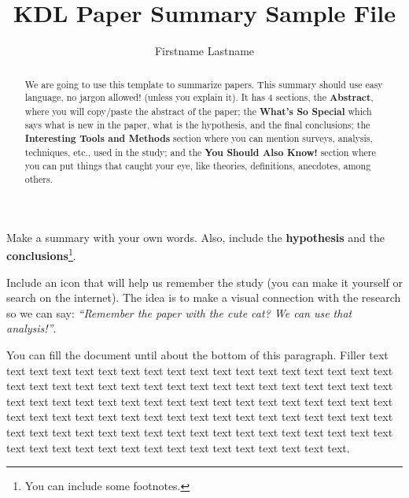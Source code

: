 \documentclass{kdl-summary}
\title{KDL Paper Summary Sample File}
\author{Firstname Lastname}
\begin{document}
\nocite{*}

\twocolumn[\maketitle]



\begin{abstract}
    We are going to use this template to summarize papers. This summary should
    use easy language, no jargon allowed! (unless you explain it).
    It has 4 sections, the \textbf{Abstract}, where you will copy/paste the
    abstract of the paper; the \textbf{What's So Special} which says what is
    new in the paper, what is the hypothesis, and the final conclusions; the
    \textbf{Interesting Tools and Methods} section where you can mention surveys,
    analysis, techniques, etc., used in the study; and the \textbf{You Should
        Also Know!} section where you can put things that caught your eye, like
    theories, definitions, anecdotes, among others.
\end{abstract}

\begin{novelty}
    Make a summary with your own words.
    Also, include the \textbf{hypothesis} and the
    \textbf{conclusions}\footnote{You can include some footnotes.}.

    Include an icon that will help us remember the study (you can make it
    yourself or search on the internet). The idea is to make a visual connection
    with the research so we can say: \emph{``Remember the paper with the cute cat? We can
    use that analysis!''}.

    You can fill the document until about the bottom of this paragraph.
    Filler
    text text text text text text text text text text
    text text text text text text text text text text
    text text text text text text text text text text
    text text text text text text text text text text
    text text text text text text text text text text
    text text text text text text text text text text
    text text text text text text text text text text
    text text text text text text text text text text
    text text text text text text text text text text
    text text text text text text text text text text
    text.
\end{novelty}
\end{document}
